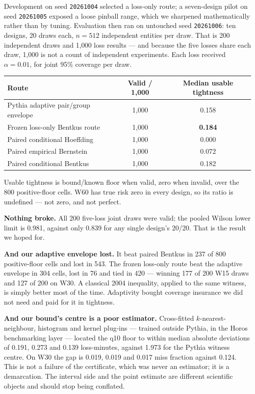 \documentclass[11pt,a4paper]{article}
\begin{document}
Development on seed \texttt{20261004} selected a loss-only route; a seven-design pilot on seed \texttt{20261005} exposed a loose pinball range, which we sharpened mathematically rather than by tuning. Evaluation then ran on untouched seed \texttt{20261006}: ten designs, 20 draws each, $n=512$ independent entities per draw. That is 200 independent draws and 1{,}000 loss results --- and because the five losses share each draw, 1{,}000 is not a count of independent experiments. Each loss received $\alpha=0.01$, for joint 95\% coverage per draw.

\begin{center}
\small
\begin{tabular}{lcc}
\toprule
\textbf{Route} & \textbf{Valid / 1{,}000} & \textbf{Median usable tightness} \\
\midrule
Pythia adaptive pair/group envelope & 1{,}000 & 0.158 \\
Frozen loss-only Bentkus route & 1{,}000 & \textbf{0.184} \\
Paired conditional Hoeffding & 1{,}000 & 0.000 \\
Paired empirical Bernstein & 1{,}000 & 0.072 \\
Paired conditional Bentkus & 1{,}000 & 0.182 \\
\bottomrule
\end{tabular}
\normalsize\par
\vspace{0.3em}
{\footnotesize Usable tightness is bound/known floor when valid, zero when invalid, over the 800 positive-floor cells. W60 has true risk zero in every design, so its ratio is undefined --- not zero, and not perfect.}
\end{center}

\textbf{Nothing broke.} All 200 five-loss joint draws were valid; the pooled Wilson lower limit is 0.981, against only 0.839 for any single design's 20/20. That is the result we hoped for.

\textbf{And our adaptive envelope lost.} It beat paired Bentkus in 237 of 800 positive-floor cells and lost in 543. The frozen loss-only route beat the adaptive envelope in 304 cells, lost in 76 and tied in 420 --- winning 177 of 200 W15 draws and 127 of 200 on W30. A classical 2004 inequality, applied to the same witness, is simply better most of the time. Adaptivity bought coverage insurance we did not need and paid for it in tightness.

\textbf{And our bound's centre is a poor estimator.} Cross-fitted $k$-nearest-neighbour, histogram and kernel plug-ins --- trained outside Pythia, in the Horos benchmarking layer --- located the q10 floor to within median absolute deviations of 0.191, 0.273 and 0.139 loss-minutes, against 1.973 for the Pythia witness centre. On W30 the gap is 0.019, 0.019 and 0.017 miss fraction against 0.124. This is not a failure of the certificate, which was never an estimator; it is a demarcation. The interval side and the point estimate are different scientific objects and should stop being conflated.
\end{document}
